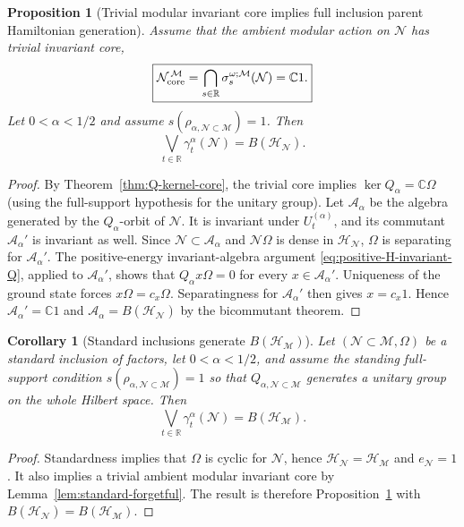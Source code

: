 \documentclass[a4paper,11pt]{article}
\newtheorem{corollary}[theorem]{Corollary}
\newtheorem{proposition}[theorem]{Proposition}
\theoremstyle{definition}
\newcommand{\mN}{\mathcal{N}}
\newcommand{\mH}{\mathcal{H}}
\newcommand{\mM}{\mathcal{M}}
\begin{document}
\begin{proposition}[Trivial modular invariant core implies full inclusion parent Hamiltonian generation]
\label{prop:Halpha-full-generation}
Assume that the ambient modular action on $\mN$ has trivial invariant core,
\begin{equation}
    \boxed{
    \mN_{\rm core}^{\,\mM}
    =
    \bigcap_{s\in\mathbb R}
    \sigma_s^{\omega;\mM}(\mN)
    =
    \mathbb C1.
    }
    \label{eq:ambient-forgetful-probing}
\end{equation}
Let $0<\alpha<1/2$ and assume
$s(\rho_{\alpha,\mN\subset\mM})=1$. Then
\begin{equation}
    \boxed{
    \bigvee_{t\in\mathbb R}
    \gamma_t^\alpha(\mN)
    =
    B(\mH_{\mN}).
    }
    \label{eq:Halpha-full-BHN}
\end{equation}
\end{proposition}

\begin{proof}
By Theorem~\ref{thm:Q-kernel-core}, the trivial core implies
$\ker Q_\alpha=\mathbb C\Omega$ (using the full-support
hypothesis for the unitary group). Let $\mathcal A_\alpha$
be the algebra generated by the $Q_\alpha$-orbit of $\mN$.
It is invariant under $U_t^{(\alpha)}$, and its commutant
$\mathcal A_\alpha'$ is invariant as well. Since
$\mN\subset\mathcal A_\alpha$ and $\mN\Omega$ is dense
in $\mH_\mN$, $\Omega$ is separating for $\mathcal A_\alpha'$.
The positive-energy invariant-algebra argument
\eqref{eq:positive-H-invariant-Q}, applied to
$\mathcal A_\alpha'$, shows that
$Q_\alpha x\Omega=0$ for every $x\in\mathcal A_\alpha'$.
Uniqueness of the ground state forces $x\Omega=c_x\Omega$.
Separatingness for $\mathcal A_\alpha'$ then gives
$x=c_x1$. Hence $\mathcal A_\alpha'=\mathbb C1$ and
$\mathcal A_\alpha=B(\mH_\mN)$ by the bicommutant theorem.
\end{proof}

\begin{corollary}[Standard inclusions generate $B(\mH_{\mM})$]
\label{cor:standard-Halpha-full-generation}
Let $(\mN\subset\mM,\Omega)$ be a standard inclusion of factors,
let $0<\alpha<1/2$, and assume the standing full-support condition
$s(\rho_{\alpha,\mN\subset\mM})=1$ so that $Q_{\alpha,\mN\subset\mM}$ generates a
unitary group on the whole Hilbert space. Then
\begin{equation}
    \boxed{
    \bigvee_{t\in\mathbb R}
    \gamma_t^\alpha(\mN)
    =B(\mH_{\mM}).
    }
    \label{eq:standard-Halpha-full-BHM}
\end{equation}
\end{corollary}
\begin{proof}
Standardness implies that $\Omega$ is cyclic for $\mN$, hence
$\mH_{\mN}=\mH_{\mM}$ and $e_{\mN}=1$. It also implies a trivial ambient modular invariant core by Lemma~\ref{lem:standard-forgetful}. The result is therefore
Proposition~\ref{prop:Halpha-full-generation} with
$B(\mH_{\mN})=B(\mH_{\mM})$.
\end{proof}
\end{document}
